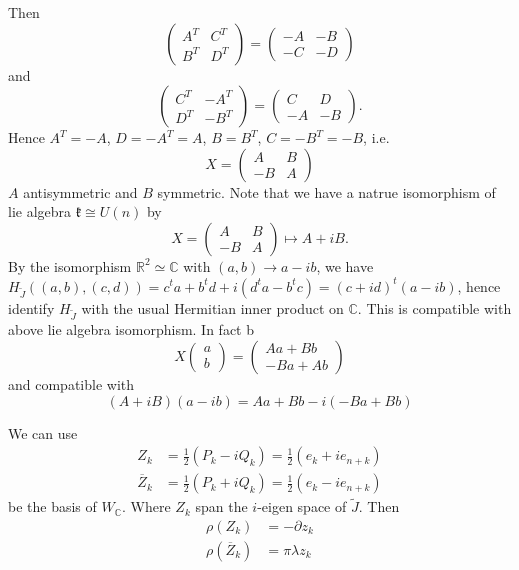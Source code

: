 \documentclass[12pt]{amsart}
\def\bR{{\mathbb{R}}}
\def\bC{{\mathbb{C}}}
\def\tJ{{\widetilde{J}}}
\def\barZ{{\overline{Z}}}
\def\fkk{\mathfrak{k}}
\def\pz#1{\partial z_{#1}}
\begin{document}
Then 
\[
\begin{pmatrix}
A^T & C^T \\
B^T & D^T 
\end{pmatrix} =
\begin{pmatrix}
-A & -B \\
-C & -D 
\end{pmatrix}
\]
and 
\[
\begin{pmatrix}
C^T & -A^T \\
D^T & -B^T 
\end{pmatrix} =
\begin{pmatrix}
C & D \\
-A & -B 
\end{pmatrix}.
\]
Hence $A^T = -A$, $D = -A^T= A$, $B = B^T$, $C = -B^T = -B$,
i.e. 
\[
X = \begin{pmatrix}
A & B\\
-B & A
\end{pmatrix}
\]
$A$ antisymmetric and $B$ symmetric.
Note that we have a natrue isomorphism of lie algebra
$\fkk \cong U(n)$ by 
\[
X = \begin{pmatrix}
A & B\\
-B & A
\end{pmatrix}
\mapsto
A + iB.
\]
By the isomorphism $\bR^2 \simeq \bC$ with $(a,b) \to a-ib$, 
we have $H_\tJ((a,b),(c,d)) = c^ta + b^td +i(d^t a- b^t c)
= (c+id)^t(a-ib)$, hence identify $H_\tJ$ with the usual Hermitian inner
product on $\bC$. This is compatible with above lie algebra isomorphism.
In fact
b\[
X\begin{pmatrix}a\\b
\end{pmatrix}
= \begin{pmatrix} Aa+Bb\\
-Ba+ Ab
\end{pmatrix} 
\]
and compatible with
\[
(A+iB)(a-ib) = Aa+Bb -i(-Ba+Bb)
\]

We can use 
\begin{align*}
Z_k  &= \frac{1}{2}(P_k-iQ_k) = \frac{1}{2}(e_k + i e_{n+k})\\
\barZ_k &= \frac{1}{2}(P_k+iQ_k) = \frac{1}{2}(e_k - i e_{n+k})
\end{align*}
be the basis of $W_{\bC}$. Where $Z_k$ span the $i$-eigen space of $\tJ$.
Then 
\begin{align*}
\rho(Z_k) &= -\pz{k} \\
\rho(\barZ_k) & = \pi\lambda z_k
\end{align*}
\end{document}
